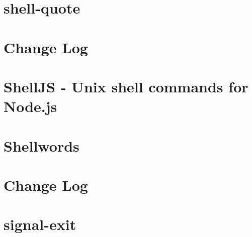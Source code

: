 \documentclass[twoside]{book}
\newcommand{\+}{\discretionary{\mbox{\scriptsize$\hookleftarrow$}}{}{}}
\begin{document}
\chapter{shell-\/quote}
\label{md__c_1_workspace_demo_src_main_script_node_modules_shell-quote_readme}

\chapter{Change Log}
\label{md__c_1_workspace_demo_src_main_script_node_modules_shelljs__c_h_a_n_g_e_l_o_g}

\chapter{Shell\+JS -\/ Unix shell commands for Node.\+js}
\label{md__c_1_workspace_demo_src_main_script_node_modules_shelljs__r_e_a_d_m_e}

\chapter{Shellwords}
\label{md__c_1_workspace_demo_src_main_script_node_modules_shellwords__r_e_a_d_m_e}

\chapter{Change Log}
\label{md__c_1_workspace_demo_src_main_script_node_modules_signal-exit__c_h_a_n_g_e_l_o_g}

\chapter{signal-\/exit}
\label{md__c_1_workspace_demo_src_main_script_node_modules_signal-exit__r_e_a_d_m_e}

\end{document}
